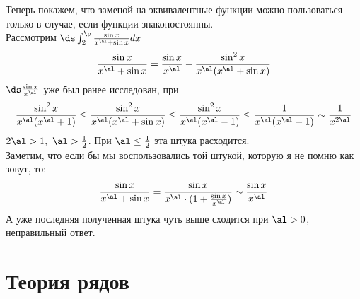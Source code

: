 \begin{example}
	Теперь покажем, что заменой на эквивалентные функции можно пользоваться только в случае, если функции знакопостоянны.\\
	Рассмотрим $\ds\int_2^\p \frac{\sin x}{x^\al+\sin x}dx$
	\[\frac{\sin x}{x^\al+\sin x}=\frac{\sin x}{x^\al}-\frac{\sin^2x}{x^\al(x^\al+\sin x)}\]
	$\ds\frac{\sin x}{x^\al}$ уже был ранее исследован, при 
	\[\frac{\sin^2x}{x^\al(x^\al+1)}\le\frac{\sin^2x}{x^\al(x^\al+\sin x)}\le\frac{\sin^2x}{x^\al(x^\al-1)}\le\frac1{x^\al(x^\al-1)}\sim\frac1{x^{2\al}}\]
	$2\al>1,\ \al>\frac12$. При $\al\le\frac12$ эта штука расходится.\\
	Заметим, что если бы мы воспользовались той штукой, которую я не помню как зовут, то:
	\[\frac{\sin x}{x^\al+\sin x}=\frac{\sin x}{x^\al\cdot(1+\frac{\sin x}{x^\al})}\sim\frac{\sin x}{x^\al}\]
	А уже последняя полученная штука чуть выше сходится при $\al>0$, неправильный ответ.
\end{example}
\section{Теория рядов}
